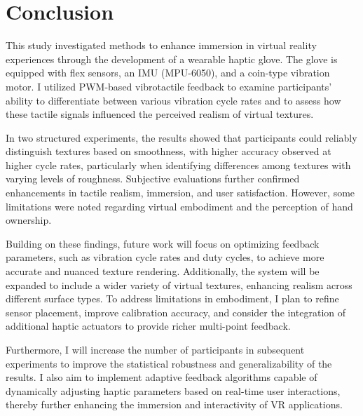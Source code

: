 \chapter{Conclusion} %

\label{Chapter6}

This study investigated methods to enhance immersion in virtual reality experiences through the development of a wearable haptic glove. The glove is equipped with flex sensors, an IMU (MPU-6050), and a coin-type vibration motor. I utilized PWM-based vibrotactile feedback to examine participants' ability to differentiate between various vibration cycle rates and to assess how these tactile signals influenced the perceived realism of virtual textures.

In two structured experiments, the results showed that participants could reliably distinguish textures based on smoothness, with higher accuracy observed at higher cycle rates, particularly when identifying differences among textures with varying levels of roughness. Subjective evaluations further confirmed enhancements in tactile realism, immersion, and user satisfaction. However, some limitations were noted regarding virtual embodiment and the perception of hand ownership.

Building on these findings, future work will focus on optimizing feedback parameters, such as vibration cycle rates and duty cycles, to achieve more accurate and nuanced texture rendering. Additionally, the system will be expanded to include a wider variety of virtual textures, enhancing realism across different surface types. To address limitations in embodiment, I plan to refine sensor placement, improve calibration accuracy, and consider the integration of additional haptic actuators to provide richer multi-point feedback. 

Furthermore, I will increase the number of participants in subsequent experiments to improve the statistical robustness and generalizability of the results. I also aim to implement adaptive feedback algorithms capable of dynamically adjusting haptic parameters based on real-time user interactions, thereby further enhancing the immersion and interactivity of VR applications.





